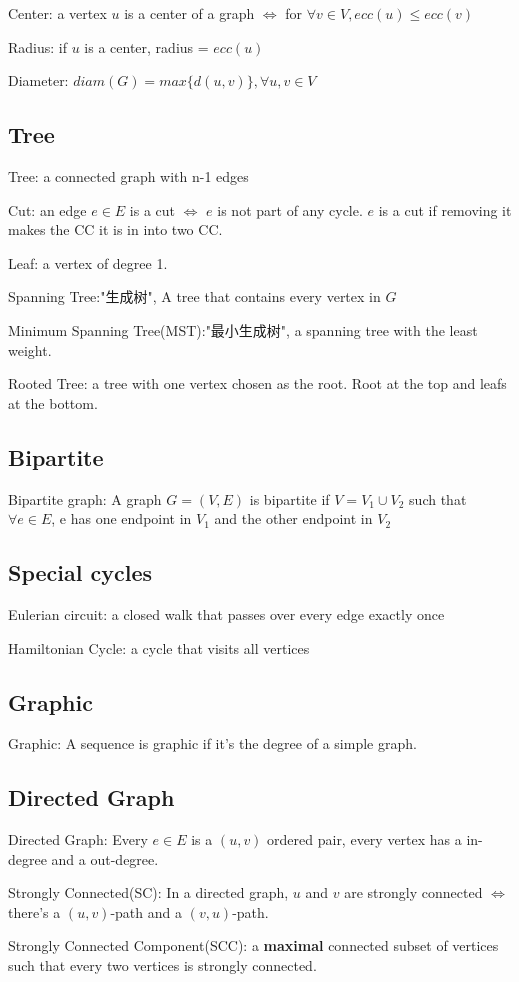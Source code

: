 \documentclass[12pt,a4paper]{ctexrep}
\begin{document}
Center: a vertex $u$ is a center of a graph $\iff$ for $\forall v \in V, ecc(u) \leq ecc(v)$

Radius: if $u$ is a center, radius = $ecc(u)$

Diameter: $diam(G) = max\{d(u,v)\},\forall u,v \in V$
\subsection{Tree}
Tree: a connected graph with n-1 edges

Cut: an edge $e \in E$ is a cut $\iff$ $e$ is not part of any cycle. $e$ is a cut if removing it makes the CC it is in into two CC. 

Leaf: a vertex of degree 1.

Spanning Tree:"生成树", A tree that contains every vertex in $G$

Minimum Spanning Tree(MST):"最小生成树", a spanning tree with the least weight.

Rooted Tree: a tree with one vertex chosen as the root. Root at the top and leafs at the bottom.
\subsection{Bipartite}
Bipartite graph: A graph $G=(V,E)$ is bipartite if $V = V_{1}\cup V_{2}$ such that $\forall e \in E$, e has one endpoint in $V_{1}$ and the other endpoint in $V_{2}$
\subsection{Special cycles}
Eulerian circuit: a closed walk that passes over every edge exactly once

Hamiltonian Cycle: a cycle that visits all vertices
\subsection{Graphic}
Graphic: A sequence is graphic if it's the degree of a simple graph.
\subsection{Directed Graph}
Directed Graph: Every $e \in E$ is a $(u,v)$ ordered pair, every vertex has a in-degree and a out-degree.

Strongly Connected(SC): In a directed graph, $u$ and $v$ are strongly connected $\iff$ there's a $(u,v)$-path and a $(v,u)$-path.

Strongly Connected Component(SCC): a \textbf{maximal} connected subset of vertices such that every two vertices is strongly connected.
\end{document}

